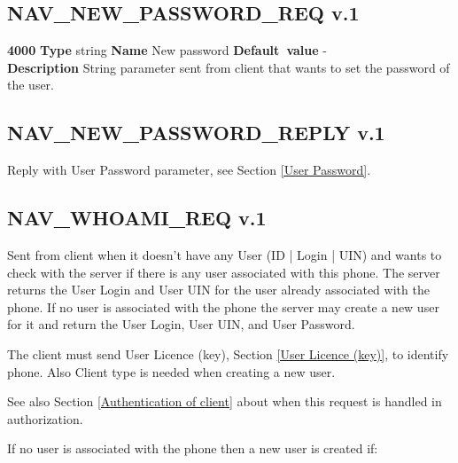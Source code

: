 \documentclass[a4paper]{article}
\begin{document}
\subsection{NAV\_NEW\_PASSWORD\_REQ v.1}

\begin{list}{\textbf{ParamID}}{}
\item \textbf{4000} \textbf{Type} string \textbf{Name} New password
                 \textbf{Default~value} - \\
  \label{New password}
  \textbf{Description} String parameter sent from client that wants to set 
  the password of the user.
\end{list}


\subsection{NAV\_NEW\_PASSWORD\_REPLY v.1}

Reply with User Password parameter, see Section \ref{User Password}.





\subsection{NAV\_WHOAMI\_REQ v.1}
\label{NAV_WHOAMI_REQ}

Sent from client when it doesn't have any User (ID | Login | UIN) and wants to
check with the server if there is any user associated with this phone.
The server returns the User Login and User UIN for the user already associated 
with the phone. If no user is associated with the phone the server may create
a new user for it and return the User Login, User UIN, and User Password.

The client must send User Licence (key), Section \ref{User Licence (key)},
to identify phone. Also Client type is needed when creating a new user.

See also Section \ref{Authentication of client} about when this request 
is handled in authorization.

If no user is associated with the phone then a new user is created if:
\end{document}
